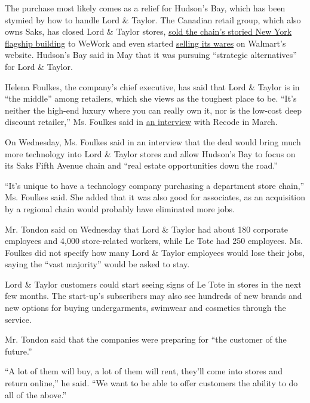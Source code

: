 The purchase most likely comes as a relief for Hudson's Bay, which has
been stymied by how to handle Lord \& Taylor. The Canadian retail group,
which also owns Saks, has closed Lord \& Taylor stores,
\href{https://www.nytimes3xbfgragh.onion/2017/10/24/business/lord-taylor-wework.html}{sold
the chain's storied New York flagship building} to WeWork and even
started
\href{https://www.nytimes3xbfgragh.onion/2018/05/16/business/walmart-lord-and-taylor-website.html}{selling
its wares} on Walmart's website. Hudson's Bay said in May that it was
pursuing ``strategic alternatives'' for Lord \& Taylor.

Helena Foulkes, the company's chief executive, has said that Lord \&
Taylor is in ``the middle'' among retailers, which she views as the
toughest place to be. ``It's neither the high-end luxury where you can
really own it, nor is the low-cost deep discount retailer,'' Ms. Foulkes
said in
\href{https://www.vox.com/podcasts/2019/3/9/18256683/hudsons-bay-helena-foulkes-saks-fifth-avenue-kara-swisher-podcast-interview-commerce-recode-decode}{an
interview} with Recode in March.

On Wednesday, Ms. Foulkes said in an interview that the deal would bring
much more technology into Lord \& Taylor stores and allow Hudson's Bay
to focus on its Saks Fifth Avenue chain and ``real estate opportunities
down the road.''

``It's unique to have a technology company purchasing a department store
chain,'' Ms. Foulkes said. She added that it was also good for
associates, as an acquisition by a regional chain would probably have
eliminated more jobs.

Mr. Tondon said on Wednesday that Lord \& Taylor had about 180 corporate
employees and 4,000 store-related workers, while Le Tote had 250
employees. Ms. Foulkes did not specify how many Lord \& Taylor employees
would lose their jobs, saying the ``vast majority'' would be asked to
stay.

Lord \& Taylor customers could start seeing signs of Le Tote in stores
in the next few months. The start-up's subscribers may also see hundreds
of new brands and new options for buying undergarments, swimwear and
cosmetics through the service.

Mr. Tondon said that the companies were preparing for ``the customer of
the future.''

``A lot of them will buy, a lot of them will rent, they'll come into
stores and return online,'' he said. ``We want to be able to offer
customers the ability to do all of the above.''

